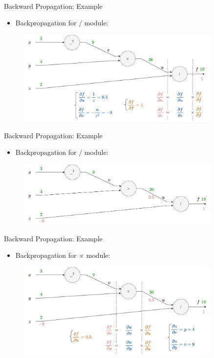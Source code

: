 \documentclass[compress,oilve,t]{beamer}
\begin{document}
\begin{frame}{Backward Propagation: Example}
	\begin{itemize}
		\item Backpropagation for $/$ module:
	\end{itemize}
	\begin{figure}[H]
		\centering
		\includegraphics[width=0.9\textwidth]{Figs/backprop_e3.png}
	\end{figure}
\end{frame}

\begin{frame}{Backward Propagation: Example}
	\begin{itemize}
		\item Backpropagation for $/$ module:
	\end{itemize}
	\begin{figure}[H]
		\centering
		\includegraphics[width=0.9\textwidth]{Figs/backprop_e4.png}
	\end{figure}
\end{frame}

\begin{frame}{Backward Propagation: Example}
	\begin{itemize}
		\item Backpropagation for $\times$ module:
	\end{itemize}
	\begin{figure}[H]
		\centering
		\includegraphics[width=0.9\textwidth]{Figs/backprop_e5.png}
	\end{figure}
\end{frame}
\end{document}
